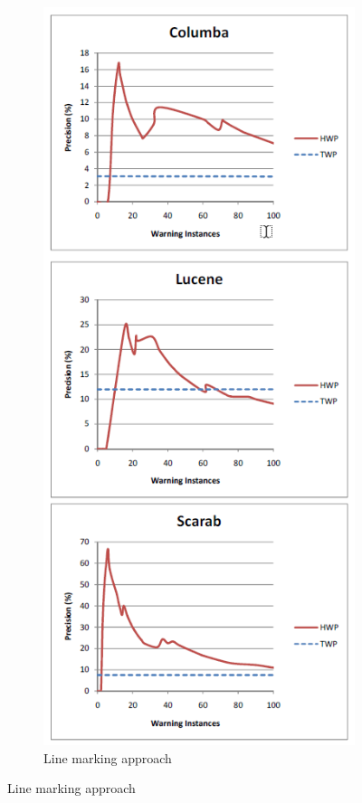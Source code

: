\begin{figure}[H]
\begin{subfigure}{0.4\textwidth}
         \includegraphics[scale=0.5]{./src/which_warnings_results.png}
         \caption{Line marking approach}\label{which_warnings:results}
     \end{subfigure}
 \end{figure}


